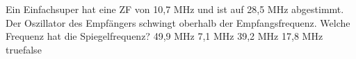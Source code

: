     {Ein Einfachsuper hat eine ZF von 10,7 MHz und ist auf 28,5 MHz abgestimmt. Der Oszillator des Empfängers schwingt oberhalb der Empfangsfrequenz. Welche Frequenz hat die Spiegelfrequenz?}
    {49,9 MHz}
    {7,1 MHz}
    {39,2 MHz}
    {17,8 MHz}
    {true}{false}